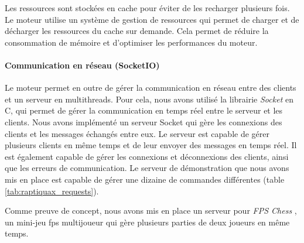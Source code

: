     Les ressources sont stockées en cache pour éviter de les recharger
    plusieurs fois. Le moteur utilise un système de gestion de
    ressources qui permet de charger et de décharger les ressources
    du cache sur demande. Cela permet de réduire la consommation de mémoire et
    d'optimiser les performances du moteur.
\paragraph{Communication en réseau (SocketIO)}

    Le moteur permet en outre de gérer la communication en réseau entre
    des clients et un serveur en multithreads. Pour cela, nous avons utilisé
    la librairie \emph{Socket} en C, qui permet de gérer la communication en
    temps réel entre le serveur et les clients.
    Nous avons implémenté un serveur Socket qui gère les connexions des
    clients et les messages échangés entre eux. Le serveur est capable de
    gérer plusieurs clients en même temps et de leur envoyer des messages
    en temps réel. Il est également capable de gérer les connexions et
    déconnexions des clients, ainsi que les erreurs de communication.
    Le serveur de démonstration que nous avons mis en place est capable de
    gérer une dizaine de commandes différentes (table \ref{tab:raptiquax_requests}).

    Comme preuve de concept, nous avons mis en place un serveur pour \og \emph{FPS Chess} \fg{}, un
    mini-jeu fps multijoueur qui gère plusieurs parties de deux joueurs en même temps.